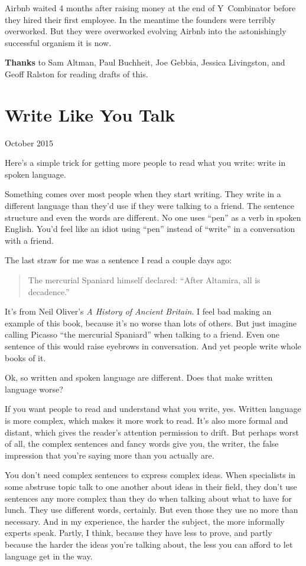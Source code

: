 \documentclass[12pt]{book}
\begin{document}
Airbnb waited 4 months after raising money at the end of Y~Combinator
before they hired their first employee. In the meantime the founders
were terribly overworked. But they were overworked evolving Airbnb into
the astonishingly successful organism it is now.


\textbf{Thanks} to Sam Altman, Paul Buchheit, Joe Gebbia, Jessica
Livingston, and Geoff Ralston for reading drafts of this.
\chapter{Write Like You Talk}

October 2015

Here's a simple trick for getting more people to read what you write:
write in spoken language.

Something comes over most people when they start writing. They write in
a different language than they'd use if they were talking to a friend.
The sentence structure and even the words are different. No one uses
``pen'' as a verb in spoken English. You'd feel like an idiot using
``pen'' instead of ``write'' in a conversation with a friend.

The last straw for me was a sentence I read a couple days ago:

\begin{quote}
The mercurial Spaniard himself declared: ``After Altamira, all is
decadence.''
\end{quote}

It's from Neil Oliver's \emph{A History of Ancient Britain}. I feel bad
making an example of this book, because it's no worse than lots of
others. But just imagine calling Picasso ``the mercurial Spaniard'' when
talking to a friend. Even one sentence of this would raise eyebrows in
conversation. And yet people write whole books of it.

Ok, so written and spoken language are different. Does that make written
language worse?

If you want people to read and understand what you write, yes. Written
language is more complex, which makes it more work to read. It's also
more formal and distant, which gives the reader's attention permission
to drift. But perhaps worst of all, the complex sentences and fancy
words give you, the writer, the false impression that you're saying more
than you actually are.

You don't need complex sentences to express complex ideas. When
specialists in some abstruse topic talk to one another about ideas in
their field, they don't use sentences any more complex than they do when
talking about what to have for lunch. They use different words,
certainly. But even those they use no more than necessary. And in my
experience, the harder the subject, the more informally experts speak.
Partly, I think, because they have less to prove, and partly because the
harder the ideas you're talking about, the less you can afford to let
language get in the way.
\end{document}
